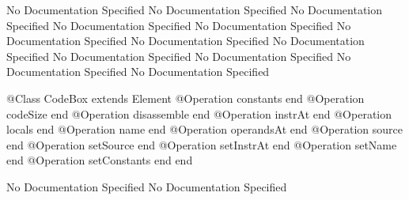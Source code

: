 No Documentation Specified
No Documentation Specified
No Documentation Specified
No Documentation Specified
No Documentation Specified
No Documentation Specified
No Documentation Specified
No Documentation Specified
No Documentation Specified
No Documentation Specified
No Documentation Specified
No Documentation Specified
\begin{Interface}
@Class CodeBox extends Element
  @Operation constants end
  @Operation codeSize end
  @Operation disassemble end
  @Operation instrAt end
  @Operation locals end
  @Operation name end
  @Operation operandsAt end
  @Operation source end
  @Operation setSource end
  @Operation setInstrAt end
  @Operation setName end
  @Operation setConstants end
end
\end{Interface}
No Documentation Specified
No Documentation Specified

